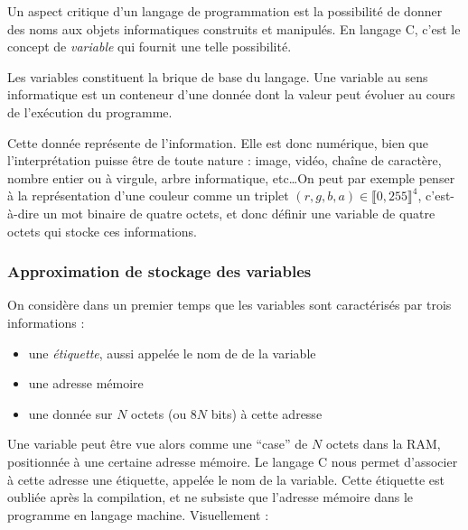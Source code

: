 \documentclass[../../../main.tex]{subfiles}
\begin{document}
Un aspect critique d'un langage de programmation est la possibilité de donner des noms aux objets informatiques construits et manipulés. En langage C, c'est le concept de \textit{variable} qui fournit une telle possibilité.

Les variables constituent la brique de base du langage. Une variable au sens informatique est un conteneur d'une donnée dont la valeur peut évoluer au cours de l'exécution du programme.
 
Cette donnée représente de l'information. Elle est donc numérique, bien que l'interprétation puisse être de toute nature : image, vidéo, chaîne de caractère, nombre entier ou à virgule, arbre informatique, etc\dots On peut par exemple penser à la représentation d'une couleur comme un triplet $(r, g, b, a)\in{\llbracket 0, 255\rrbracket^{4}}$, c'est-à-dire un mot binaire de quatre octets, et donc définir une variable de quatre octets qui stocke ces informations.
 
\subsubsection{Approximation de stockage des variables}
 
On considère dans un premier temps que les variables sont caractérisés par trois informations :
\begin{itemize}
	\item une \textit{étiquette}, aussi appelée le nom de de la variable
	\item une adresse mémoire
	\item une donnée sur $N$ octets (ou $8N$ bits) à cette adresse
\end{itemize}
Une variable peut être vue alors comme une ``case'' de $N$ octets dans la RAM, positionnée à une certaine adresse mémoire. Le langage C nous permet d'associer à cette adresse une étiquette, appelée le nom de la variable. Cette étiquette est oubliée après la compilation, et ne subsiste que l'adresse mémoire dans le programme en langage machine.\newline
Visuellement :

\begin{minipage}{\textwidth}
	\begin{center}
		
		\label{img:variable}
	\end{center}
\end{minipage}
\end{document}

